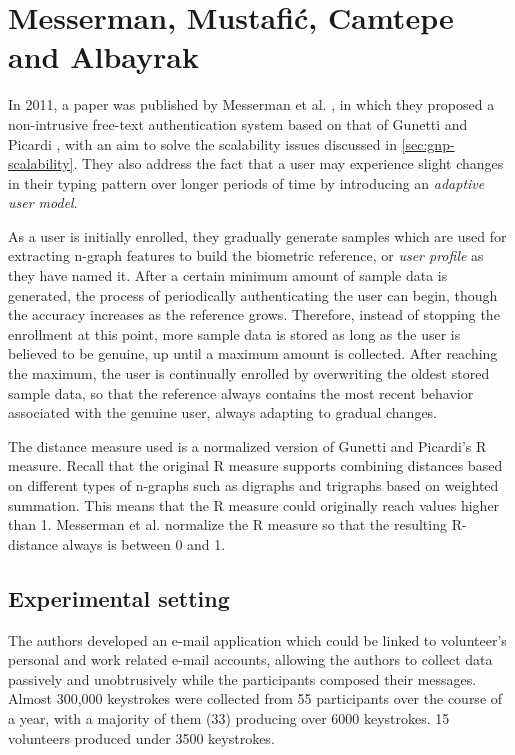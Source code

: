 \documentclass[informationsecurity]{gucmasterproject}
\begin{document}
\chapter{Messerman, Mustafić, Camtepe and Albayrak}
\label{chap:messerman}

In 2011, a paper was published by Messerman et al. \cite{Messerman}, in which they proposed a non-intrusive free-text authentication system based on that of Gunetti and Picardi \cite{gnp}, with an aim to solve the scalability issues discussed in \cref{sec:gnp-scalability}.
They also address the fact that a user may experience slight changes in their typing pattern over longer periods of time by introducing an \textit{adaptive user model}.

As a user is initially enrolled, they gradually generate samples which are used for extracting n-graph features to build the biometric reference, or \textit{user profile} as they have named it.
After a certain minimum amount of sample data is generated, the process of periodically authenticating the user can begin, though the accuracy increases as the reference grows.
Therefore, instead of stopping the enrollment at this point, more sample data is stored as long as the user is believed to be genuine, up until a maximum amount is collected.
After reaching the maximum, the user is continually enrolled by overwriting the oldest stored sample data, so that the reference always contains the most recent behavior associated with the genuine user, always adapting to gradual changes.

The distance measure used is a normalized version of Gunetti and Picardi's R measure.
Recall that the original R measure supports combining distances based on different types of n-graphs such as digraphs and trigraphs based on weighted summation.
This means that the R measure could originally reach values higher than 1.
Messerman et al. \cite{Messerman} normalize the R measure so that the resulting R-distance always is between 0 and 1.

\section{Experimental setting}
\label{sec:messerman-experimental}
The authors developed an e-mail application which could be linked to volunteer's personal and work related e-mail accounts, allowing the authors to collect data passively and unobtrusively while the participants composed their messages.
Almost 300,000 keystrokes were collected from 55 participants over the course of a year, with a majority of them (33) producing over 6000 keystrokes.
15 volunteers produced under 3500 keystrokes.
\end{document}
